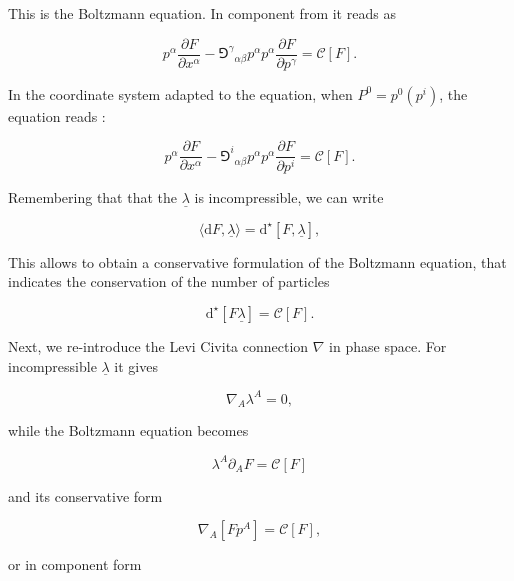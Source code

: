 \documentclass[11pt,a4paper,headinclude=true,DIV=14,BCOR=8mm,chapterprefix,listof=totoc,twoside,openright,abstracton]{scrbook}
\begin{document}
This is the Boltzmann equation. In component from it reads as 

\begin{equation}
    p^{\alpha}\frac{\partial F}{\partial x^{\alpha}} - {\Game^{\gamma}}_{\alpha\beta}p^{\alpha}p^{\alpha}\frac{\partial F}{\partial p^{\gamma}} =\mathcal{C}[F].
\end{equation}

In the coordinate system adapted to the equation, when $P^0 = p^0(p^i)$, the equation reads \cite{Cercignani:2002}:

\begin{equation}
p^{\alpha}\frac{\partial F}{\partial x^{\alpha}} - {\Game^{i}}_{\alpha\beta}p^{\alpha}p^{\alpha}\frac{\partial F}{\partial p^{i}} =\mathcal{C}[F].
\end{equation}

Remembering that that the $\underline{\lambda}$ is incompressible, we can write

\begin{equation}
    \langle\text{d}F,\underline{\lambda}\rangle = \text{d}^{\star}[F,\underline{\lambda}],
\end{equation}

This allows to obtain a conservative formulation of the Boltzmann equation, that indicates the conservation of the number of particles \cite{Cardall:2002bp}

\begin{equation}
    \text{d}^{\star}[F\underline{\lambda}] = \mathcal{C}[F].
\end{equation}

Next, we re-introduce the Levi Civita connection $\nabla$ in phase space. For incompressible $\underline{\lambda}$ it gives

\begin{equation}
    \nabla_A\lambda^A=0,
\end{equation}

while the Boltzmann equation becomes 

\begin{equation}
    \lambda^A\partial_A F=\mathcal{C}[F]
\end{equation}

and its conservative form 

\begin{equation}
    \nabla_A[Fp^{A}] = \mathcal{C}[F],
    \label{eq:theory:liouvilletheorem}
\end{equation}

or in component form
\end{document}
